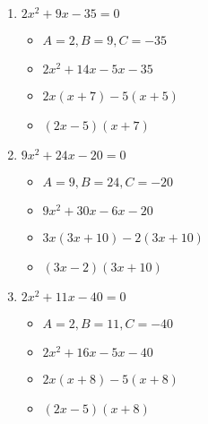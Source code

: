 \documentclass{article}
\begin{document}
\begin{enumerate}
\begin{itemize}
  \end{itemize}
\item $2x^{2} + 9x - 35 =0$
  \begin{itemize}
  \item $A=2, B=9, C=-35$
  \item $2x^{2}+14x-5x-35$
  \item $2x(x+7)-5(x+5)$
  \item $(2x-5)(x+7)$
  \end{itemize}
\item $9x^{2} + 24x - 20 = 0$
  \begin{itemize}
  \item $A=9, B=24, C=-20$
  \item $9x^{2}+30x-6x-20$
  \item $3x(3x+10)-2(3x+10)$
  \item $(3x-2)(3x+10)$
  \end{itemize}
\item $2x^{2} + 11x - 40 = 0$
  \begin{itemize}
  \item $A=2, B=11, C=-40$
  \item $2x^{2}+16x-5x-40$
  \item $2x(x+8)-5(x+8)$
  \item $(2x-5)(x+8)$
  \end{itemize}
\end{enumerate}

\newpage
\end{document}
